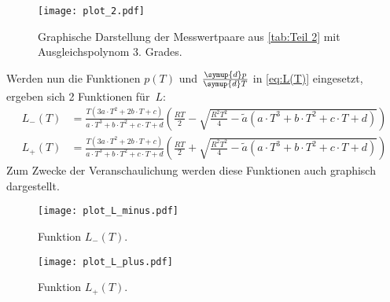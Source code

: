 \begin{figure}[H]
  \centering
  \texttt{[image: plot\_2.pdf]}
  \caption{Graphische Darstellung der Messwertpaare aus \autoref{tab:Teil 2} mit Ausgleichspolynom 3. Grades.}
  \label{fig:3.Grad Fit}
\end{figure}

Werden nun die Funktionen $p(T)$ und $\frac{\symup{d}p}{\symup{d}T}$ in \eqref{eq:L(T)} eingesetzt, ergeben sich 2 Funktionen
für~$L$:
\begin{align*}
  L_{-}(T) &= \frac{T(3a \cdot T^2 + 2b\cdot T + c)}{a \cdot T^3 + b\cdot T^2 + c \cdot T + d}\left(\frac{RT}{2} - \sqrt{\frac{R^2T^2}{4}-\tilde{a}(a \cdot T^3 + b\cdot T^2 + c \cdot T + d)}\right) \\
  L_{+}(T) &= \frac{T(3a \cdot T^2 + 2b\cdot T + c)}{a \cdot T^3 + b\cdot T^2 + c \cdot T + d}\left(\frac{RT}{2} + \sqrt{\frac{R^2T^2}{4}-\tilde{a}(a \cdot T^3 + b\cdot T^2 + c \cdot T + d)}\right)
\end{align*}
Zum Zwecke der Veranschaulichung werden diese Funktionen auch graphisch dargestellt.

\begin{figure}[H]
  \centering
  \texttt{[image: plot\_L\_minus.pdf]}
  \caption{Funktion $L_{-}(T)$.}
  \label{fig:L_minus}
\end{figure}

\begin{figure}[H]
  \centering
  \texttt{[image: plot\_L\_plus.pdf]}
  \caption{Funktion $L_{+}(T)$.}
  \label{fig:L_plus}
\end{figure}